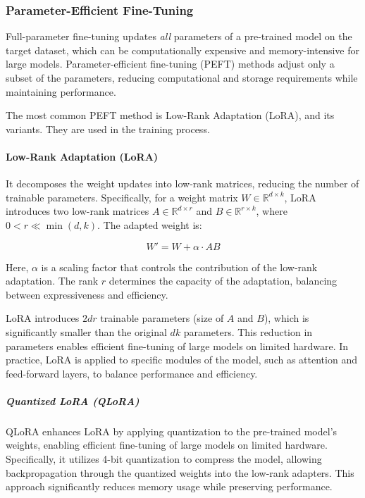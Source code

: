 \documentclass[11pt, onecolumn]{article}
\newcounter{para}
\begin{document}
\subsubsection{Parameter-Efficient Fine-Tuning} \label{sec:peft}
Full-parameter fine-tuning updates \textit{all} parameters of a pre-trained model on the target dataset, which can be computationally expensive and memory-intensive for large models. Parameter-efficient fine-tuning (PEFT) methods adjust only a subset of the parameters, reducing computational and storage requirements while maintaining performance.

The most common PEFT method is Low-Rank Adaptation (LoRA), and its variants. They are used in the training process.

\paragraph{Low-Rank Adaptation (LoRA)} \label{sec:pre-lora}
It decomposes the weight updates into low-rank matrices, reducing the number of trainable parameters. Specifically, for a weight matrix \( W \in \mathbb{R}^{d \times k} \), LoRA introduces two low-rank matrices \( A \in \mathbb{R}^{d \times r} \) and \( B \in \mathbb{R}^{r \times k} \), where \( 0 < r \ll \min(d, k) \). The adapted weight is:

\[
W' = W + \alpha \cdot A B
\]

Here, \( \alpha \) is a scaling factor that controls the contribution of the low-rank adaptation. The rank \( r \) determines the capacity of the adaptation, balancing between expressiveness and efficiency.

LoRA introduces \( 2dr \) trainable parameters (size of \( A \) and \( B \)), which is significantly smaller than the original \( dk \) parameters. This reduction in parameters enables efficient fine-tuning of large models on limited hardware. In practice, LoRA is applied to specific modules of the model, such as attention and feed-forward layers, to balance performance and efficiency.

\subparagraph{Quantized LoRA (QLoRA)} \label{sec:pre-qlora}

QLoRA enhances LoRA by applying quantization to the pre-trained model's weights, enabling efficient fine-tuning of large models on limited hardware. Specifically, it utilizes 4-bit quantization to compress the model, allowing backpropagation through the quantized weights into the low-rank adapters. This approach significantly reduces memory usage while preserving performance.
\end{document}
